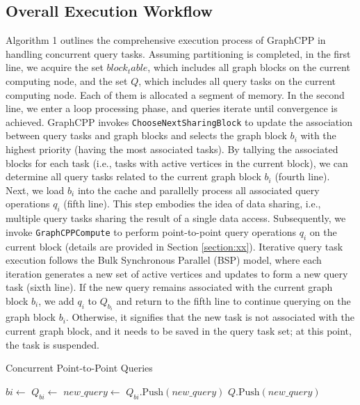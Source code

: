 \documentclass[lettersize,journal]{IEEEtran} %
\begin{document}
\subsection{Overall Execution Workflow}
Algorithm 1 outlines the comprehensive execution process of GraphCPP in handling concurrent query tasks. Assuming partitioning is completed, in the first line, we acquire the set \(block_table\), which includes all graph blocks on the current computing node, and the set \(Q\), which includes all query tasks on the current computing node. Each of them is allocated a segment of memory. In the second line, we enter a loop processing phase, and queries iterate until convergence is achieved. GraphCPP invokes \texttt{ChooseNextSharingBlock} to update the association between query tasks and graph blocks and selects the graph block \(b_i\) with the highest priority (having the most associated tasks). By tallying the associated blocks for each task (i.e., tasks with active vertices in the current block), we can determine all query tasks related to the current graph block \(b_i\) (fourth line). Next, we load \(b_i\) into the cache and parallelly process all associated query operations \(q_i\) (fifth line). This step embodies the idea of data sharing, i.e., multiple query tasks sharing the result of a single data access. Subsequently, we invoke \texttt{GraphCPPCompute} to perform point-to-point query operations \(q_i\) on the current block (details are provided in Section \ref{section:xx}). Iterative query task execution follows the Bulk Synchronous Parallel (BSP) model, where each iteration generates a new set of active vertices and updates to form a new query task (sixth line). If the new query remains associated with the current graph block \(b_i\), we add \(q_i\) to \(Q_{b_i}\) and return to the fifth line to continue querying on the graph block \(b_i\). Otherwise, it signifies that the new task is not associated with the current graph block, and it needs to be saved in the query task set; at this point, the task is suspended.

\begin{algorithm}
\caption{Concurrent Point-to-Point Queries}
\label{alg:concurrent_queries}
\begin{algorithmic}[1]

    \State {}
        \State $bi \gets$ 
        \State $Q_{bi} \gets$ 
            \State $new\_query \gets$ 
                \State $Q_{bi}.\text{Push}(new\_query)$
            \Else
                \State $Q.\text{Push}(new\_query)$
            \EndIf
        \EndFor
    \EndWhile
\EndFunction

\end{algorithmic}
\end{algorithm}
  
\end{document}

